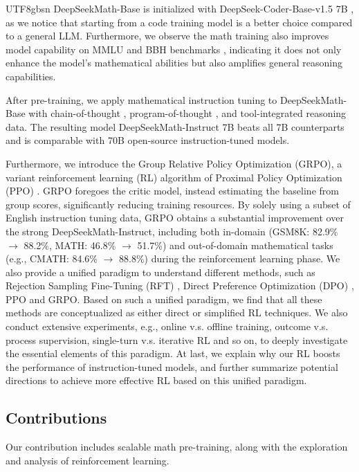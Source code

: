 \documentclass[11pt, a4paper, logo, copyright, nonumbering]{deepseek}
\newcommand{\spmath}{DeepSeekMath}
\begin{document}
\begin{CJK*}{UTF8}{gbsn}
\spmath-Base is initialized with DeepSeek-Coder-Base-v1.5 7B \citep{deepseek-coder}, as we notice that starting from a code training model is a better choice compared to a general LLM. Furthermore, we observe the math training also improves model capability on MMLU \citep{mmlu} and BBH benchmarks \citep{bbh}, indicating it does not only enhance the model's mathematical abilities but also amplifies general reasoning capabilities.

After pre-training, we apply mathematical instruction tuning to \spmath-Base with chain-of-thought \citep{cot}, program-of-thought \citep{pot,pal}, and tool-integrated reasoning \citep{tora} data.
The resulting model \spmath-Instruct 7B beats all 7B counterparts and is comparable with 70B open-source instruction-tuned models.  

Furthermore, we introduce the Group Relative Policy Optimization (GRPO), a variant reinforcement learning (RL) algorithm of Proximal Policy Optimization (PPO) \citep{schulman2017proximal}.
GRPO foregoes the critic model, instead estimating
the baseline from group scores, significantly reducing training resources.
By solely using a subset of English instruction tuning data, GRPO obtains a substantial improvement over the strong DeepSeekMath-Instruct, including both in-domain (GSM8K: 82.9\% $\rightarrow$ 88.2\%, MATH: 46.8\% $\rightarrow$ 51.7\%) and out-of-domain mathematical tasks (e.g., CMATH: 84.6\% $\rightarrow$ 88.8\%) during the reinforcement learning phase.
We also provide a unified paradigm to understand different methods, such as Rejection Sampling Fine-Tuning (RFT) \citep{yuan2023scaling}, Direct Preference Optimization (DPO) \citep{dpo}, PPO and GRPO.
Based on such a unified paradigm, we find that all these methods are conceptualized as either direct or simplified RL techniques. 
We also conduct extensive experiments, e.g., online v.s. offline training, outcome v.s. process supervision, single-turn v.s. iterative RL and so on, to deeply investigate the essential elements of this paradigm.
At last, we explain why our RL boosts the performance of instruction-tuned models, and further summarize potential directions to achieve more effective RL based on this unified paradigm.

\subsection{Contributions}
Our contribution includes scalable math pre-training, along with the exploration and analysis of reinforcement learning.


\end{CJK*}
\end{document}
